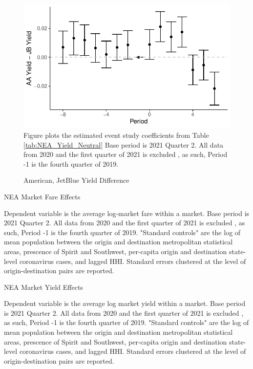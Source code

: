 \documentclass{article}
\begin{document}
\begin{appendices}
	\begin{figure}
		\caption{American, JetBlue Yield Difference}
		\label{fig:NEA_Yield_Neutral}
		\includegraphics[width = \linewidth]{NEA_Price_Neutrality_Graph_Y}
		\footnotesize{Figure plots the estimated event study coefficients from Table \ref{tab:NEA_Yield_Neutral} Base period is 2021 Quarter 2. All data from 2020 and the first quarter of 2021 is excluded , as such,  Period -1 is the fourth quarter of 2019.}
	\end{figure}
	
	\begin{table}
		\caption{NEA Market Fare Effects}
		\label{tab:NEA_Market_Fare}
		
		\footnotesize{Dependent variable is the average log-market fare within a market. Base period is 2021 Quarter 2. All data from 2020 and the first quarter of 2021 is excluded , as such,  Period -1 is the fourth quarter of 2019. "Standard controls" are the log of mean population between the origin and destination metropolitan statistical areas, prescence of Spirit and Southwest, per-capita origin and destination state-level coronavirus cases, and lagged HHI. Standard errors clustered at the level of origin-destination pairs are reported.  }
	\end{table}
	
	\begin{table}
		\caption{NEA Market Yield Effects}
		\label{tab:NEA_Market_Yield}
		
		\footnotesize{Dependent variable is the average log market yield within a market. Base period is 2021 Quarter 2. All data from 2020 and the first quarter of 2021 is excluded , as such,  Period -1 is the fourth quarter of 2019. "Standard controls" are the log of mean population between the origin and destination metropolitan statistical areas, prescence of Spirit and Southwest, per-capita origin and destination state-level coronavirus cases, and lagged HHI. Standard errors clustered at the level of origin-destination pairs are reported.  }
	\end{table}
	

\end{appendices}
\end{document}
